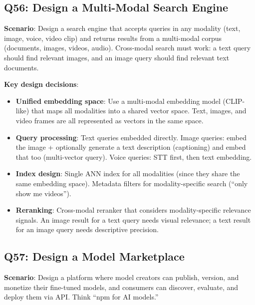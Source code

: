 \subsection{Q56: Design a Multi-Modal Search Engine}

\textbf{Scenario}: Design a search engine that accepts queries in any modality (text, image, voice, video clip) and returns results from a multi-modal corpus (documents, images, videos, audio). Cross-modal search must work: a text query should find relevant images, and an image query should find relevant text documents.

\textbf{Key design decisions}:
\begin{itemize}[leftmargin=*]
    \item \textbf{Unified embedding space}: Use a multi-modal embedding model (CLIP-like) that maps all modalities into a shared vector space. Text, images, and video frames are all represented as vectors in the same space.
    \item \textbf{Query processing}: Text queries embedded directly. Image queries: embed the image + optionally generate a text description (captioning) and embed that too (multi-vector query). Voice queries: STT first, then text embedding.
    \item \textbf{Index design}: Single ANN index for all modalities (since they share the same embedding space). Metadata filters for modality-specific search (``only show me videos'').
    \item \textbf{Reranking}: Cross-modal reranker that considers modality-specific relevance signals. An image result for a text query needs visual relevance; a text result for an image query needs descriptive precision.
\end{itemize}

\subsection{Q57: Design a Model Marketplace}

\textbf{Scenario}: Design a platform where model creators can publish, version, and monetize their fine-tuned models, and consumers can discover, evaluate, and deploy them via API. Think ``npm for AI models.''


